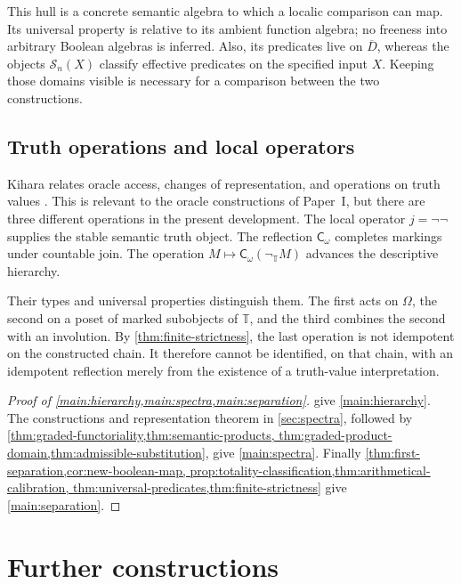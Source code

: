 \documentclass[11pt,a4paper]{article}
\numberwithin{equation}{section}
\theoremstyle{definition}
\theoremstyle{remark}
\theoremstyle{plain}
\newcommand{\TV}{\mathbb T}
\newcommand{\Cw}{\mathsf C_{\omega}}
\newcommand{\SSn}{\mathcal S}
\newcommand{\negT}{\neg_{\TV}}
\begin{document}
This hull is a concrete semantic algebra to which a localic comparison
can map. Its universal property is relative to its ambient function
algebra; no freeness into arbitrary Boolean algebras is inferred.
Also, its predicates live on $\overline D$, whereas the objects
$\SSn_n(X)$ classify effective predicates on the specified input
$X$. Keeping those domains visible is necessary for a comparison
between the two constructions.

\subsection{Truth operations and local operators}

Kihara relates oracle access, changes of representation, and operations
on truth values \cite{kihara}. This is relevant to the oracle
constructions of Paper~I, but there are three different operations in
the present development. The local operator $j=\neg\neg$ supplies
the stable semantic truth object. The reflection $\Cw$ completes
markings under countable join. The operation
$M\mapsto\Cw(\negT M)$ advances the descriptive hierarchy.

Their types and universal properties distinguish them. The first acts
on $\Omega$, the second on a poset of marked subobjects of $\TV$,
and the third combines the second with an involution. By
\cref{thm:finite-strictness}, the last operation is not idempotent on
the constructed chain. It therefore cannot be identified, on that
chain, with an idempotent reflection merely from the existence of a
truth-value interpretation.

\begin{proof}[Proof of \cref{main:hierarchy,main:spectra,main:separation}]
give \cref{main:hierarchy}. The constructions and representation
theorem in \cref{sec:spectra}, followed by
\cref{thm:graded-functoriality,thm:semantic-products,
thm:graded-product-domain,thm:admissible-substitution}, give
\cref{main:spectra}. Finally
\cref{thm:first-separation,cor:new-boolean-map,
prop:totality-classification,thm:arithmetical-calibration,
thm:universal-predicates,thm:finite-strictness}
give \cref{main:separation}.
\end{proof}

\section{Further constructions}
\label{sec:further}
\end{document}
